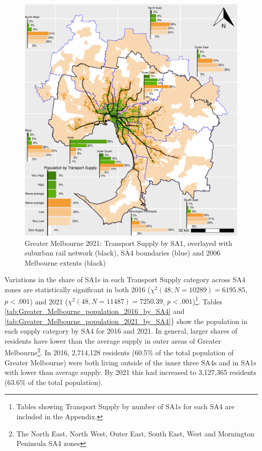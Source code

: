 \documentclass[preprint, 3p,
authoryear]{elsarticle} %
\begin{document}
\begin{figure}
\centering
\includegraphics{ReynoldsCurrieQu2024_files/figure-latex/Greater_Melbourne_population_2021_by_SA4-1.pdf}
\caption{Greater Melbourne 2021: Transport Supply by SA1, overlayed with
suburban rail network (black), SA4 boundaries (blue) and 2006 Melbourne
extents (black)}
\end{figure}

Variations in the share of SA1s in each Transport Supply category across
SA4 zones are statistically significant in both 2016
(\(\chi^2(48, N = 10289) = 6195.85\), \(p < .001\)) and 2021
(\(\chi^2(48, N = 11487) = 7250.39\), \(p < .001\))\footnote{Tables
  showing Transport Supply by number of SA1s for each SA4 are included
  in the Appendix.}. Tables
\ref{tab:Greater_Melbourne_population_2016_by_SA4} and
\ref{tab:Greater_Melbourne_population_2021_by_SA4}\} show the population
in each supply category by SA4 for 2016 and 2021. In general, larger
shares of residents have lower than the average supply in outer areas of
Greater Melbourne\footnote{The North East, North West, Outer East, South
  East, West and Mornington Peninsula SA4 zones}. In 2016, 2,714,128
residents (60.5\% of the total population of Greater Melbourne) were
both living outside of the inner three SA4s and in SA1s with lower than
average supply. By 2021 this had increased to 3,127,365 residents
(63.6\% of the total population).
\end{document}
